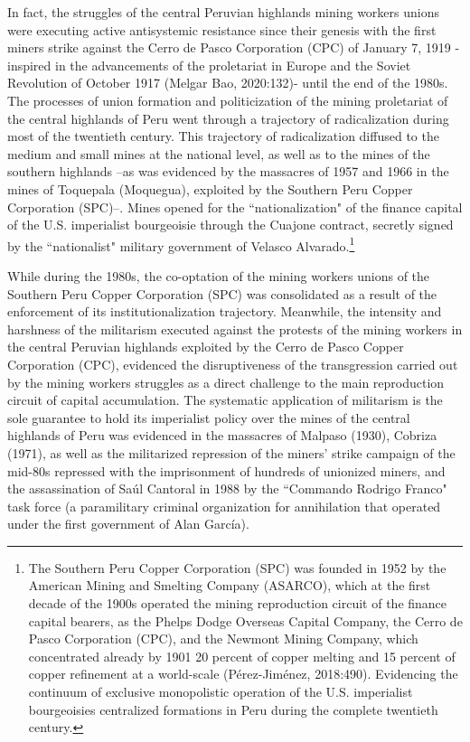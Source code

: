 \documentclass[]{interact}
\theoremstyle{plain}%
\theoremstyle{definition}
\theoremstyle{remark}
\begin{document}
In fact, the struggles of the central Peruvian highlands mining workers unions were executing active antisystemic resistance since their genesis with the first miners strike against the Cerro de Pasco Corporation (CPC) of January 7, 1919 -inspired in the advancements of the proletariat in Europe and the Soviet Revolution of October 1917 (Melgar Bao, 2020:132)- until the end of the 1980s.  The processes of union formation and politicization of the mining proletariat of the central highlands of Peru went through a trajectory of radicalization during most of the twentieth century. This trajectory of radicalization diffused to the medium and small mines at the national level, as well as to the mines of the southern highlands –as was evidenced by the massacres of 1957 and 1966 in the mines of Toquepala (Moquegua), exploited by the Southern Peru Copper Corporation (SPC)–. Mines opened for the “nationalization" of the finance capital of the U.S. imperialist bourgeoisie through the Cuajone contract, secretly signed by the “nationalist" military government of Velasco Alvarado.\footnote{The Southern Peru Copper Corporation (SPC) was founded in 1952 by the American Mining and Smelting Company (ASARCO), which at the first decade of the 1900s operated the mining reproduction circuit of the finance capital bearers, as the Phelps Dodge Overseas Capital Company, the Cerro de Pasco Corporation (CPC), and the Newmont Mining Company, which concentrated already by 1901 20 percent of copper melting and 15 percent of copper refinement at a world-scale (Pérez-Jiménez, 2018:490). Evidencing the continuum of exclusive monopolistic operation of the U.S. imperialist bourgeoisies centralized formations in Peru during the complete twentieth century.}

While during the 1980s, the co-optation of the mining workers unions of the Southern Peru Copper Corporation (SPC) was consolidated as a result of the enforcement of its institutionalization trajectory. Meanwhile, the intensity and harshness of the militarism executed against the protests of the mining workers in the central Peruvian highlands exploited by the Cerro de Pasco Copper Corporation (CPC), evidenced the disruptiveness of the transgression carried out by the mining workers struggles as a direct challenge to the main reproduction circuit of capital accumulation. The systematic application of militarism is the sole guarantee to hold its imperialist policy over the mines of the central highlands of Peru was evidenced in the massacres of Malpaso (1930), Cobriza (1971), as well as the militarized repression of the miners' strike campaign of the mid-80s repressed with the imprisonment of hundreds of unionized miners, and the assassination of Saúl Cantoral in 1988 by the “Commando Rodrigo Franco" task force (a paramilitary criminal organization for annihilation that operated under the first government of Alan García).
\end{document}
